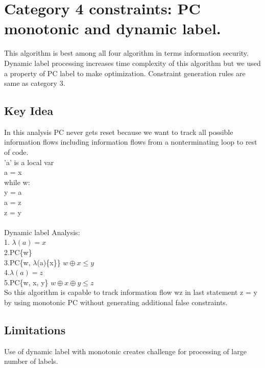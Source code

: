 \chapter{Category 4 constraints: PC monotonic and dynamic label.}
\label{ch:c4}
This algorithm is best among all four algorithm in terms information security. Dynamic label processing increases time complexity of this algorithm but we used a property of PC label to make optimization.
Constraint generation rules are same as category 3.
\section{Key Idea} In this analysis PC never gets reset because we want to track all possible information flows including information flows from a nonterminating loop to rest of code.\\ 
'a' is a local var\\
a = x\\
while w:\\
\hspace*{1cm} y = a\\
\hspace*{1cm} a = z\\
z = y\\~\\
Dynamic label Analysis:\\
1. $\lambda(a) = x$\\
2.PC\{w\}\\
3.PC\{w, $\lambda$(a)\{x\}\} \hspace{1cm} $w\oplus x \le y$\\
4.$\lambda(a) = z$\\
5.PC\{w, x, y\} \hspace{1cm} $w\oplus x\oplus y \le z$\\

So this algorithm is capable to track information flow w\marr z in last statement z = y by using monotonic PC without generating additional false constraints. 
\section{Limitations}
Use of dynamic label with monotonic creates challenge for processing of large number of labels.  
